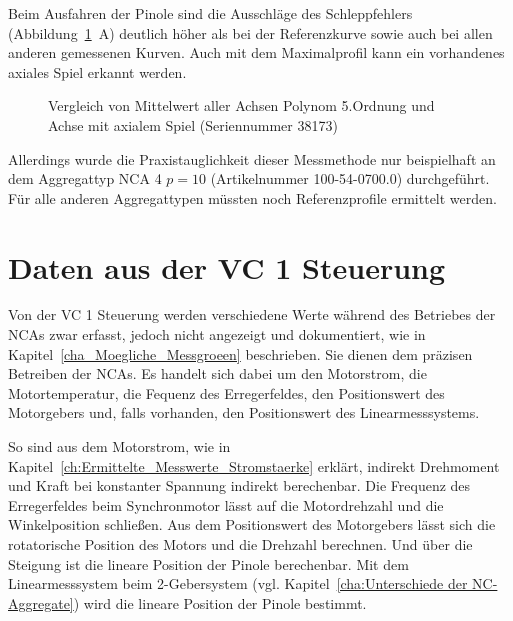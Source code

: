 Beim Ausfahren der Pinole sind die Ausschläge des Schleppfehlers (Abbildung~\ref{fig:Vergleich von Mittelwert polynom 5.Ordnung und Achse mit axialem Spiel}~A) deutlich höher als bei der Referenzkurve sowie auch bei allen anderen gemessenen Kurven. Auch mit dem Maximalprofil kann ein vorhandenes axiales Spiel erkannt werden.





\begin{figure}[h]
\centering

\caption{Vergleich von Mittelwert aller Achsen Polynom 5.Ordnung und Achse mit axialem Spiel (Seriennummer 38173)}
\label{fig:Vergleich von Mittelwert polynom 5.Ordnung und Achse mit axialem Spiel}
\end{figure}






Allerdings wurde die Praxistauglichkeit dieser Messmethode nur beispielhaft an dem Aggregattyp NCA 4 $p = 10$ (Artikelnummer 100-54-0700.0) durchgeführt. Für alle anderen Aggregattypen müssten noch Referenzprofile ermittelt werden. 




\section{Daten aus der VC 1 Steuerung}


Von der VC 1 Steuerung werden verschiedene Werte während des Betriebes der NCAs zwar erfasst, jedoch nicht angezeigt und dokumentiert, wie in Kapitel~\ref{cha_Moegliche_Messgroeen} beschrieben. Sie dienen dem präzisen Betreiben der NCAs. Es handelt sich dabei um den Motorstrom, die Motortemperatur, die Fequenz des Erregerfeldes, den Positionswert des Motorgebers und, falls vorhanden, den Positionswert des Linearmesssystems.

So sind aus dem Motorstrom, wie in Kapitel~\ref{ch:Ermittelte_Messwerte_Stromstaerke} erklärt, indirekt Drehmoment und Kraft bei konstanter Spannung indirekt berechenbar. Die Frequenz des Erregerfeldes beim Synchronmotor lässt auf die Motordrehzahl und die Winkelposition schließen. Aus dem Positionswert des Motorgebers lässt sich die rotatorische Position des Motors und die Drehzahl berechnen. Und über die Steigung ist die lineare Position der Pinole berechenbar. Mit dem Linearmesssystem beim 2-Gebersystem (vgl. Kapitel~\ref{cha:Unterschiede der NC-Aggregate}) wird die lineare Position der Pinole bestimmt.

